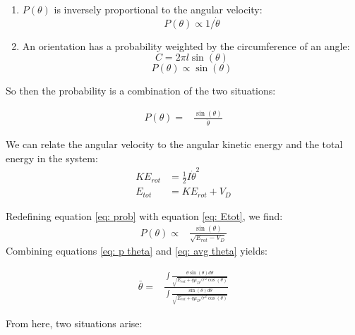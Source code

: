 \documentclass[a4paper]{article}
\begin{document}
\begin{enumerate}
\item $P(\theta)$ is inversely proportional to the angular velocity:
$$P(\theta) \propto 1/\dot{\theta}$$
\item An orientation has a probability weighted by the circumference of an angle:
$$C=2\pi l \sin(\theta)$$
$$ P(\theta) \propto \sin(\theta) $$
\end{enumerate}

So then the probability is a combination of the two situations:

\begin{align}
    P(\theta)=&\frac{\sin(\theta)}{\dot{\theta}} \label{eq: prob}
\end{align}

We can relate the angular velocity to the angular kinetic energy and the total energy in the system:
\begin{align}
    KE_{rot} & = \frac{1}{2}I\dot{\theta}^2 \nonumber \\
    E_{tot} & = KE_{rot} + V_D \label{eq: Etot}
\end{align}

Redefining equation \ref{eq: prob} with equation \ref{eq: Etot}, we find:
\begin{align}
    P(\theta) \propto & \frac{\sin(\theta)}{\sqrt{E_{rot}-V_D}} \label{eq: p theta}
\end{align}
%
Combining equations \ref{eq: p theta} and \ref{eq: avg theta} yields:

\begin{align}
    \bar{\theta} = & \frac{\int\frac{\theta \sin(\theta)d\theta}{\sqrt{E_{rot}+q\mu_D/r^2 \cos(\theta)}}}{\int\frac{\sin(\theta)d\theta}{\sqrt{E_{rot}+q\mu_D/r^2 \cos(\theta)}}} \label{eq: avg theta int}
\end{align}

From here, two situations arise:
\end{document}
